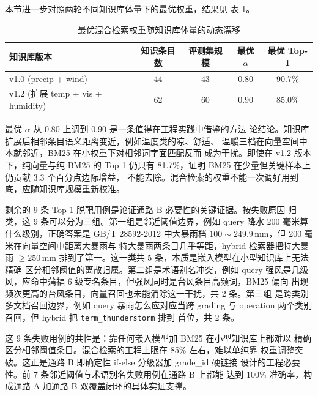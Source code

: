 \documentclass[a4paper]{article}
\newcommand{\song}{\CJKfamily{song}}
\newcommand{\wuhao}{\fontsize{10.5pt}{18pt}\selectfont}
\theoremstyle{definition}
\theoremstyle{plain}
\theoremstyle{remark}
\newcommand{\reftab}[1]{表 \ref{#1}}
\newcommand{\bk}{\discretionary{}{}{}}
\begin{document}
本节进一步对照两轮不同知识库体量下的最优权重，结果见
\reftab{tab:rag-weight-drift}。

\begin{table}[H]
    \centering
    \caption{最优混合检索权重随知识库体量的动态漂移}
    \label{tab:rag-weight-drift}
    \song\wuhao
    \begin{tabular}{lcccc}
        \toprule
        知识库版本 & 知识条目数 & 评测集规模 & 最优 $\alpha$ & 最优 Top-1 \\
        \midrule
        v1.0 (precip + wind) & 44 & 43 & 0.80 & 90.7\% \\
        v1.2 (扩展 temp + vis + humidity) & 62 & 60 & 0.90 & 85.0\% \\
        \bottomrule
    \end{tabular}
\end{table}

最优 $\alpha$ 从 0.80 上调到 0.90 是一条值得在工程实践中借鉴的方法
论结论。知识库扩展后相邻条目语义距离变近，例如温度类的凉、舒适、
温暖三档在向量空间中本就邻近，BM25 在小权重下对相邻词字面匹配反而
成为干扰。即使在 v1.2 版本下，纯向量与纯 BM25 的 Top-1 仍只有
81.7\%，证明 BM25 在少量但关键样本上仍贡献 3.3 个百分点边际增益，
不能去除。混合检索的权重不能一次调好用到底，应随知识库规模重新校准。

剩余的 9 条 Top-1 脱靶用例是论证通路 B 必要性的关键证据。按失败原因
归类，这 9 条可以分为三组。第一组是邻近阈值边界，例如 query 降水
200 毫米算什么级别，正确答案是 GB/T 28592-2012 中大暴雨档
$100\sim249.9\,\mathrm{mm}$，但 200 毫米在向量空间中距离大暴雨与
特大暴雨两条目几乎等距，hybrid 检索器把特大暴雨 $\geq 250\,\mathrm{mm}$
排到了第一。这一类共 5 条，本质是嵌入模型在小型知识库上无法精确
区分相邻阈值的离散归属。第二组是术语别名冲突，例如 query 强风是几级
风，应命中蒲福 6 级专名条目，但强风同时是台风条目高频词，BM25 偏向
出现频次更高的台风条目，向量召回也未能消除这一干扰，共 2 条。第三组
是跨类别多文档召回边界，例如 query 暴雨怎么应对应当跨 grading 与
operation 两个类别召回，但 hybrid 把 \texttt{term\_\bk{}thunderstorm} 排到
首位，共 2 条。

这 9 条失败用例的共性是：靠任何嵌入模型加 BM25 在小型知识库上都难以
精确区分相邻阈值条目。混合检索的工程上限在 85\% 左右，难以单纯靠
权重调整突破。这正是通路 B 即确定性 if-else 分级器加 grade\_id 硬链接
设计的工程必要性。前 7 条邻近阈值与术语别名失败用例在通路 B 上都能
达到 100\% 准确率，构成通路 A 加通路 B 双覆盖闭环的具体实证支撑。
\end{document}
